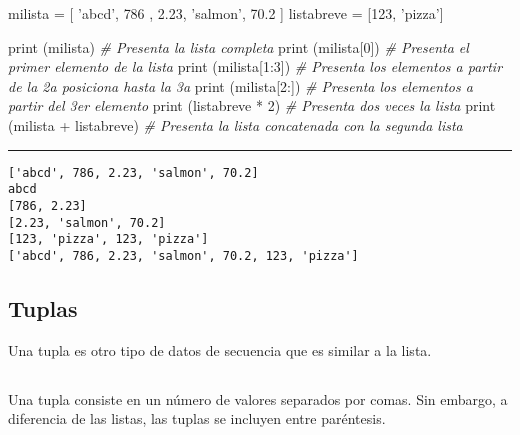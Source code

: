 \documentclass[]{article}
\newenvironment{Shaded}{}{}
\newcommand{\DecValTok}[1]{\textcolor[rgb]{0.25,0.63,0.44}{#1}}
\newcommand{\FloatTok}[1]{\textcolor[rgb]{0.25,0.63,0.44}{#1}}
\newcommand{\StringTok}[1]{\textcolor[rgb]{0.25,0.44,0.63}{#1}}
\newcommand{\CommentTok}[1]{\textcolor[rgb]{0.38,0.63,0.69}{\textit{#1}}}
\newcommand{\OperatorTok}[1]{\textcolor[rgb]{0.40,0.40,0.40}{#1}}
\newcommand{\BuiltInTok}[1]{#1}
\newcommand{\NormalTok}[1]{#1}
\begin{document}
\begin{Shaded}
\begin{Highlighting}[]
\NormalTok{milista }\OperatorTok{=}\NormalTok{ [ }\StringTok{'abcd'}\NormalTok{, }\DecValTok{786}\NormalTok{ , }\FloatTok{2.23}\NormalTok{, }\StringTok{'salmon'}\NormalTok{, }\FloatTok{70.2}\NormalTok{ ]}
\NormalTok{listabreve }\OperatorTok{=}\NormalTok{ [}\DecValTok{123}\NormalTok{, }\StringTok{'pizza'}\NormalTok{]}

\BuiltInTok{print}\NormalTok{ (milista)              }\CommentTok{# Presenta la lista completa}
\BuiltInTok{print}\NormalTok{ (milista[}\DecValTok{0}\NormalTok{])          }\CommentTok{# Presenta el primer elemento de la lista}
\BuiltInTok{print}\NormalTok{ (milista[}\DecValTok{1}\NormalTok{:}\DecValTok{3}\NormalTok{])        }\CommentTok{# Presenta los elementos a partir de la 2a posiciona hasta la 3a}
\BuiltInTok{print}\NormalTok{ (milista[}\DecValTok{2}\NormalTok{:])          }\CommentTok{# Presenta los elementos a partir del 3er elemento}
\BuiltInTok{print}\NormalTok{ (listabreve }\OperatorTok{*} \DecValTok{2}\NormalTok{)       }\CommentTok{# Presenta dos veces la lista}
\BuiltInTok{print}\NormalTok{ (milista }\OperatorTok{+}\NormalTok{ listabreve) }\CommentTok{# Presenta la lista concatenada con la segunda lista}
\end{Highlighting}
\end{Shaded}

\begin{center}\rule{0.5\linewidth}{\linethickness}\end{center}

\begin{verbatim}
['abcd', 786, 2.23, 'salmon', 70.2]
abcd
[786, 2.23]
[2.23, 'salmon', 70.2]
[123, 'pizza', 123, 'pizza']
['abcd', 786, 2.23, 'salmon', 70.2, 123, 'pizza']
\end{verbatim}

\subsection{Tuplas}\label{tuplas}

Una tupla es otro tipo de datos de secuencia que es similar a la lista.

\subsection{}\label{section-31}

Una tupla consiste en un número de valores separados por comas. Sin
embargo, a diferencia de las listas, las tuplas se incluyen entre
paréntesis.
\end{document}
